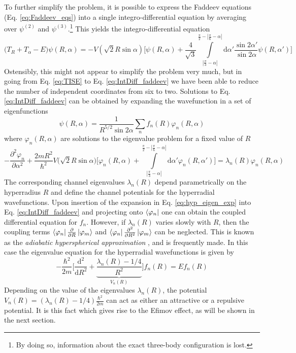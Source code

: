 \documentclass[prl,onecolumn,amsmath,amssymb,titlepage,nofootinbib,preprint]{revtex4-1}
\begin{document}
To further simplify the problem, it is possible to express the Faddeev equations (Eq. \ref{eq:Faddeev_eqs}) into a single integro-differential equation by averaging over $\psi^{(2)}$ and $\psi^{(3)}$.\footnote{By doing so, information about the exact three-body configuration is lost.} This yields the integro-differential equation
	\begin{equation}\label{eq:IntDiff_faddeev}
		\big(T_{R}+T_{\alpha}-E\big)\psi(R,\alpha)=-V(\sqrt{2}R\sin\alpha)\Bigg[\psi(R,\alpha)+\frac{4}{\sqrt{3}}\int\limits_{|\frac{\pi}{3}-\alpha|}^{\frac{\pi}{2}-|\frac{\pi}{6}-\alpha|}\mathrm{d}\alpha'\frac{\sin2\alpha'}{\sin2\alpha}\psi(R,\alpha')\Bigg]
	\end{equation}
Ostensibly, this might not appear to simplify the problem very much, but in going from Eq. \ref{eq:TISE} to Eq. \ref{eq:IntDiff_faddeev} we have been able to reduce the number of independent coordinates from six to two. Solutions to  Eq. \ref{eq:IntDiff_faddeev} can be obtained by expanding the wavefunction in a set of eigenfunctions
	\begin{equation}\label{eq:hyp_eigen_exp}
		\psi(R,\alpha)=\frac{1}{R^{5/2}\sin2\alpha}\sum_{n}f_{n}(R)\varphi_{n}(R,\alpha)
	\end{equation}
where $\varphi_{n}(R,\alpha)$ are solutions to the eigenvalue problem for a fixed value of $R$
 	\begin{equation}\label{eq:hyperangular_eigen_ODE}
 		-\frac{\partial^{2}\varphi_{n}}{\partial\alpha^{2}}+\frac{2mR^{2}}{\hbar^{2}}
 		V\big(\sqrt{2}R\sin\alpha\big)\Bigg[\varphi_{n}(R,\alpha)+\int\limits_{|\frac{\pi}{3}-\alpha|}^{\frac{\pi}{2}-|\frac{\pi}{6}-\alpha|}\mathrm{d}\alpha'\varphi_{n}(R,\alpha')\Bigg]=\lambda_{n}(R)\varphi_{n}(R,\alpha)
 	\end{equation}
 The corresponding channel eigenvalues $\lambda_{n}(R)$ depend parametrically on the hyperradius $R$ and define the channel potentials for the hyperradial wavefunctions.  Upon insertion of the expansion in Eq. \ref{eq:hyp_eigen_exp} into Eq. \ref{eq:IntDiff_faddeev} and projecting onto $\bra{\varphi_{n}}$ one can obtain the coupled differential equation for $f_{n}$.  However, if $\lambda_{n}(R)$ varies slowly with $R$, then the coupling terms $\bra{\varphi_{n}}\frac{\partial}{\partial R}\ket{\varphi_{m}}$ and $\bra{\varphi_{n}}\frac{\partial^{2}}{\partial R^{2}}\ket{\varphi_{m}}$ can be neglected.  This is known as the \textit{adiabatic hyperspherical approximation} \cite{Braaten_2006}\cite{Fedorov1993}, and is frequently made.  In this case the eigenvalue equation for the hyperradial wavefunctions is given by
 	\begin{equation}\label{eq:hyperrad_eigen_ODE}
 		-\frac{\hbar^{2}}{2m}\Bigg[\frac{\mathrm{d}^{2}}{\mathrm{d}R^{2}}+\underbrace{\frac{\lambda_{n}(R)-1/4}{R^{2}}}_{V_{n}(R)}
 		\Bigg]f_{n}(R)=Ef_{n}(R)
 	\end{equation}
 Depending on the value of the eigenvalues $\lambda_{n}(R)$, the potential $V_{n}(R)=(\lambda_{n}(R)-1/4)\frac{\hbar^{2}}{2m}$  can act as either an attractive or a repulsive potential.  It is this fact which gives rise to the Efimov effect, as will be shown in the next section.
\end{document}
